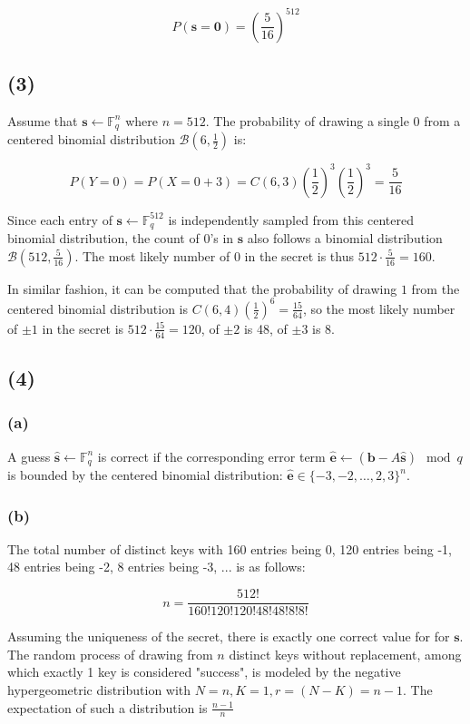 \documentclass{article}
\begin{document}
$$
P(\mathbf{s} = \mathbf{0}) = (\frac{5}{16})^{512}
$$

\subsection*{(3)}
Assume that $\mathbf{s} \leftarrow \mathbb{F}_q^n$ where $n = 512$. The probability of drawing a single $0$ from a centered binomial distribution $\mathcal{B}(6, \frac{1}{2})$ is:

$$
P(Y=0) = P(X = 0 + 3) = C(6, 3)(\frac{1}{2})^3(\frac{1}{2})^3 = \frac{5}{16}
$$

Since each entry of $\mathbf{s} \leftarrow \mathbb{F}_q^{512}$ is independently sampled from this centered binomial distribution, the count of $0$'s in $\mathbf{s}$ also follows a binomial distribution $\mathcal{B}(512, \frac{5}{16})$. The most likely number of $0$ in the secret is thus $512 \cdot \frac{5}{16} = 160$.

In similar fashion, it can be computed that the probability of drawing $1$ from the centered binomial distribution is $C(6, 4)(\frac{1}{2})^6 = \frac{15}{64}$, so the most likely number of $\pm 1$ in the secret is $512 \cdot \frac{15}{64} = 120$, of $\pm 2$ is 48, of $\pm 3$ is 8.

\subsection*{(4)}
\subsubsection*{(a)}
A guess $\hat{\mathbf{s}} \leftarrow \mathbb{F}_q^n$ is correct if the corresponding error term $\hat{\mathbf{e}} \leftarrow (\mathbf{b} - A\hat{\mathbf{s}}) \mod q$ is bounded by the centered binomial distribution: $\hat{\mathbf{e}} \in \{-3, -2, \ldots, 2, 3\}^n$.

\subsubsection*{(b)}
The total number of distinct keys with 160 entries being 0, 120 entries being -1, 48 entries being -2, 8 entries being -3, ... is as follows:

$$
n = \frac{512!}{160!120!120!48!48!8!8!}
$$

Assuming the uniqueness of the secret, there is exactly one correct value for for $\mathbf{s}$. The random process of drawing from $n$ distinct keys without replacement, among which exactly 1 key is considered "success", is modeled by the negative hypergeometric distribution with $N = n, K = 1, r = (N - K) = n - 1$. The expectation of such a distribution is $\frac{n-1}{n}$
\end{document}
